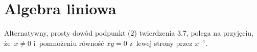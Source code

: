 \documentclass[a4paper,11pt]{article}
\begin{document}










\newpage
\section{Algebra liniowa}

\vspace{\spaceTwo}







\start {}

\vspace{\spaceFour}


\start {} Alternatywny, prosty dowód podpunkt (2) twierdzenia
3.7, polega na przyjęciu, że~$x \neq 0$ i~pomnożeniu równość $xy = 0$
z~lewej strony przez $x^{ -1 }$.

\vspace{\spaceFour}
\end{document}
